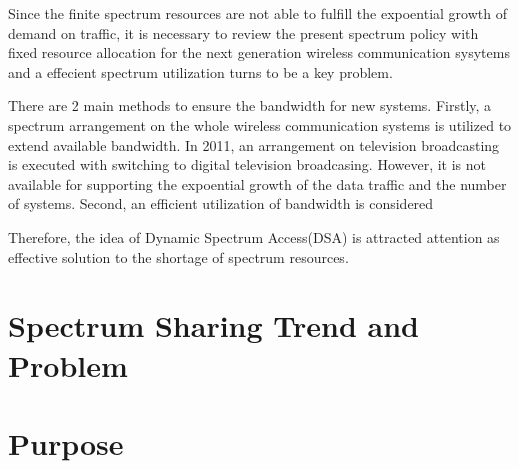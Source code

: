 Since the finite spectrum resources are not able to fulfill the expoential growth of demand on traffic, it is necessary to review the present spectrum policy with fixed resource allocation for the next generation wireless communication sysytems and a effecient spectrum utilization turns to be a key problem. 

There are 2 main methods to ensure the bandwidth for new systems. Firstly, a spectrum arrangement on the whole wireless communication systems is utilized to extend available bandwidth. In 2011, an arrangement on television broadcasting is executed with switching to digital television broadcasing. However, it is not available for supporting the expoential growth of the data traffic and the number of systems. Second, an efficient utilization of bandwidth is considered  

Therefore, the idea of Dynamic Spectrum Access(DSA) is attracted attention as effective solution to the shortage of spectrum resources. 



\section{Spectrum Sharing Trend and Problem}

\section{Purpose}


